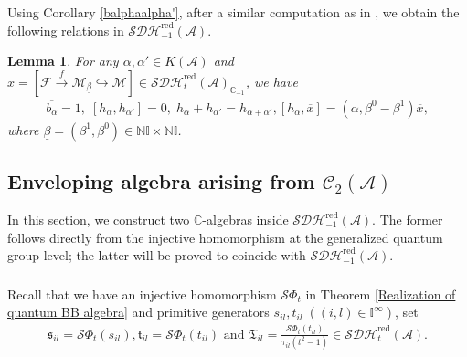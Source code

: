 \documentclass[12pt]{amsart}
\newtheorem{lemma}[theorem]{Lemma}
\theoremstyle{definition}
\numberwithin{equation}{section}
\begin{document}
Using Corollary \ref{balphaalpha'}, after a similar computation as in \cite[Lemma 6.3]{FLX24}, we obtain the following relations in $ \mathcal{SDH}_{-1}^{\mathrm{red}}(\mathcal{A}) $.

\begin{lemma}
    \label{Properties of minus}
    For any $ \alpha,\alpha' \in K(\mathcal{A}) $ and $ x=[\mathcal{F} \xrightarrow{f} \mathcal{M}_{\underline{\beta}} \hookrightarrow \mathcal{M} ] \in \mathcal{SDH}_t^{\mathrm{red}}(\mathcal{A})_{\mathbb{C}_{-1}} $, we have
    \begin{align*}
    \overline{b_{\alpha}} =1,\; [h_{\alpha},h_{\alpha'}] = 0,\; h_{\alpha} + h_{\alpha'} = h_{\alpha+\alpha'},  [h_{\alpha},\overline{x}] = (\alpha,\beta^0-\beta^1)\overline{x},
    \end{align*}
    where $ \underline{\beta} = (\beta^1,\beta^0) \in \mathbb{N}\mathbb{I} \times \mathbb{N}\mathbb{I} $.
\end{lemma}



\subsection{Enveloping algebra arising from \texorpdfstring{$ \mathcal{C}_2(\mathcal{A}) $}{C2A} }\;
\label{Enveloping algebra arising from C2A}

In this section, we construct two $ \mathbb{C} $-algebras inside $ \mathcal{SDH}_{-1}^{\mathrm{red}}(\mathcal{A}) $. 
The former follows directly from the injective homomorphism at the generalized quantum group level; the latter will be proved to coincide with  $ \mathcal{SDH}_{-1}^{\mathrm{red}}(\mathcal{A}) $.

\subsubsection{}

Recall that we have an injective homomorphism $ \mathcal{S}\Phi_t $ in Theorem \ref{Realization of quantum BB algebra} and primitive generators $ s_{il},t_{il}\;((i,l) \in \mathbb{I}^{\infty}) $, set
\begin{align*}
    \mathfrak{s}_{il} = \mathcal{S}\Phi_t(s_{il}), \mathfrak{t}_{il} = \mathcal{S}\Phi_t(t_{il}) \text{ and } \mathfrak{T}_{il} = \frac{\mathcal{S}\Phi_t(t_{il})}{\tau_{il}(t^2-1)} \in \mathcal{SDH}^{\mathrm{red}}_t(\mathcal{A}).
\end{align*}
\end{document}
